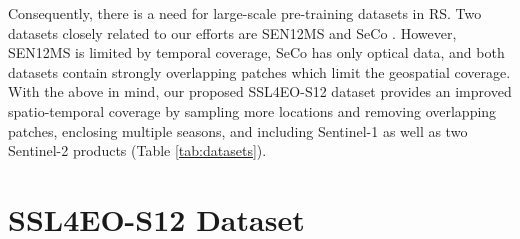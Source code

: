 \documentclass[lettersize,journal]{IEEEtran}
\begin{document}
Consequently, there is a need for large-scale pre-training datasets in RS. Two datasets closely related to our efforts are SEN12MS \cite{Schmitt2019} and SeCo \cite{manas2021seasonal}. However, SEN12MS is limited by temporal coverage, SeCo has only optical data, and both datasets contain strongly overlapping patches which limit the geospatial coverage. With the above in mind, our proposed SSL4EO-S12 dataset provides an improved spatio-temporal coverage by sampling more locations and removing overlapping patches, enclosing multiple seasons, and including Sentinel-1 as well as two Sentinel-2 products (Table \ref{tab:datasets}).     

\begin{table*}[]
\centering
\caption{Summary of popular medium-resolution pre-training datasets in remote sensing. LC: land cover.}
\label{tab:datasets}
\vspace{-1em}
\end{table*}


\section{SSL4EO-S12 Dataset}
\label{sec:ssl4eo-s12}
\end{document}
